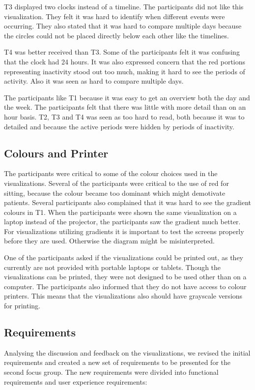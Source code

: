 T3 displayed two clocks instead of a timeline. The participants did not like this visualization. They felt it was hard to identify when different events were occurring. They also stated that it was hard to compare multiple days because the circles could not be placed directly below each other like the timelines.

T4 was better received than T3. Some of the participants felt it was confusing that the clock had 24 hours. It was also expressed concern that the red portions representing inactivity stood out too much, making it hard to see the periods of activity. Also it was seen as hard to compare multiple days.

The participants like T1 because it was easy to get an overview both the day and the week. The participants felt that there was little with more detail than on an hour basis. T2, T3 and T4 was seen as too hard to read, both because it was to detailed and because the active periods were hidden by periods of inactivity.

\subsection{Colours and Printer}
The participants were critical to some of the colour choices used in the visualizations. Several of the participants were critical to the use of red for sitting, because the colour became too dominant which might demotivate patients. Several participants also complained that it was hard to see the gradient colours in T1. When the participants were shown the same visualization on a laptop instead of the projector, the participants saw the gradient much better. For visualizations utilizing gradients it is important to test the screens properly before they are used. Otherwise the diagram might be misinterpreted. 

One of the participants asked if the visualizations could be printed out, as they currently are not provided with portable laptops or tablets. Though the visualizations can be printed, they were not designed to be used other than on a computer. The participants also informed that they do not have access to colour printers. This means that the visualizations also should have grayscale versions for printing. 

\subsection{Requirements}
Analysing the discussion and feedback on the visualizations, we revised the initial requirements and created a new set of requirements to be presented for the second focus group. The new requirements were divided into functional requirements and user experience requirements:

